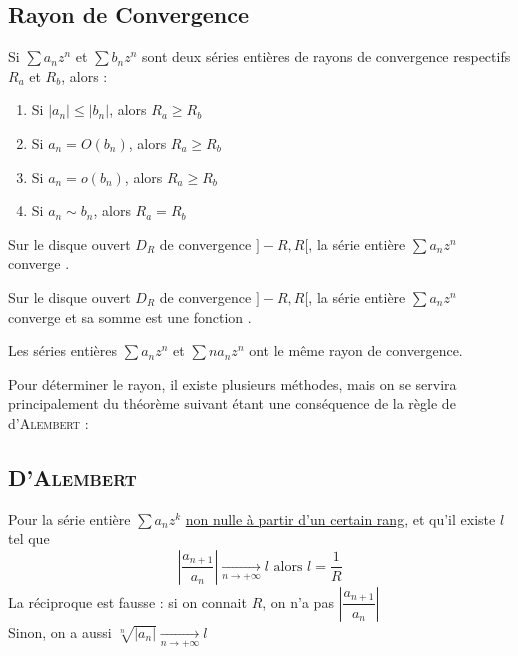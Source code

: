 \documentclass[11pt,a4paper,fleqn,pdftex]{report}
\begin{document}
\subsection{Rayon de Convergence}
\begin{itheorem}
     Si $\sum a_n z^n$ et $\sum b_n z^n$ sont deux séries entières de rayons de convergence respectifs $R_a$ et $R_b$, alors : 
     \renewcommand{\theenumi}{\roman{enumi}}
     \begin{enumerate}
         \item Si $|a_n| \le |b_n|$, alors $R_a \ge R_b$
         \item Si $a_n = O(b_n)$, alors $R_a \ge R_b$
         \item Si $a_n = o(b_n)$, alors $R_a \ge R_b$
         \item Si $a_n \sim b_n$, alors $R_a = R_b$
     \end{enumerate}
\end{itheorem}
\begin{theorem}
Sur le disque ouvert $D_R$ de convergence $]-R,R[$, la série entière $\sum a_n z^n$ converge .
\end{theorem}
\begin{theorem}
Sur le disque ouvert $D_R$ de convergence $]-R,R[$, la série entière $\sum a_n z^n$ converge  et sa somme est une fonction .
\end{theorem}
\begin{theorem}
     Les séries entières $\sum a_n z^n$ et $\sum na_n z^n$ ont le même rayon de convergence.
\end{theorem}
Pour déterminer le rayon, il existe plusieurs méthodes, mais on se servira principalement du théorème suivant étant une conséquence de la règle de d'\textsc{Alembert} :\\

\subsection{D'\textsc{Alembert}}
\begin{itheorem}
Pour la série entière $\sum a_n z^{k}$ \uline{non nulle à partir d'un certain rang}, et qu'il existe $l$ tel que 
\[
\boxed{\left|\dfrac{a_{n+1}}{a_n}\right|\xrightarrow[n\to +\infty]{}l} \text{ alors } l = \frac{1}{R}
\]
La réciproque est fausse : si on connait $R$, on n'a pas $\left|\dfrac{a_{n+1}}{a_n}\right|$\\
Sinon, on a aussi $\sqrt[n]{|a_n|}\xrightarrow[n\to +\infty]{}l$
\end{itheorem}
\end{document}
